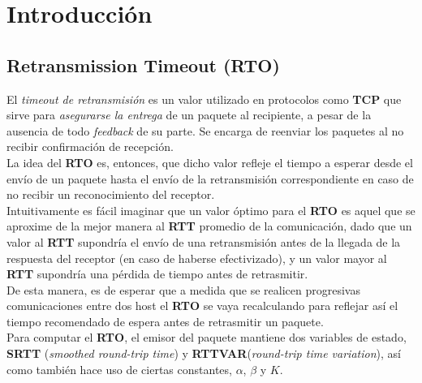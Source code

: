 \section{Introducción}

\subsection{Retransmission Timeout (RTO)}

\indent El \textit{timeout de retransmisión} es un valor utilizado en protocolos 
como \textbf{TCP} que sirve para \textit{asegurarse la entrega} de un paquete al
recipiente, a pesar de la ausencia de todo \textit{feedback} de su parte. Se 
encarga de reenviar los paquetes al no recibir confirmación de recepción.\\

\indent La idea del \textbf{RTO} es, entonces, que dicho valor refleje el tiempo a esperar desde el envío de un paquete hasta el envío de la retransmisión correspondiente en caso de no recibir un reconocimiento del receptor.\\

\indent Intuitivamente es fácil imaginar que un valor óptimo para el \textbf{RTO} es aquel que se aproxime de la mejor manera al \textbf{RTT} promedio de la comunicación, dado que un valor al \textbf{RTT} supondría el envío de una retransmisión antes de la llegada de la respuesta del receptor (en caso de haberse efectivizado), y un valor mayor al \textbf{RTT} supondría una pérdida de tiempo antes de retrasmitir.\\

\indent De esta manera, es de esperar que a medida que se realicen progresivas comunicaciones entre dos host el \textbf{RTO} se vaya recalculando para reflejar así el tiempo recomendado de espera antes de retrasmitir un paquete.\\

\indent Para computar el \textbf{RTO}, el emisor del paquete mantiene dos
variables de estado, \textbf{SRTT} (\textit{smoothed round-trip time}) y \textbf{RTTVAR}(\textit{round-trip time variation}), así como también hace uso de ciertas constantes, $\alpha$, $\beta$ y $K$.\\

